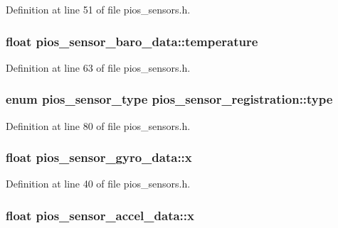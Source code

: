 Definition at line 51 of file pios\-\_\-sensors.\-h.

\hypertarget{group___p_i_o_s___s_e_n_s_o_r_s_ga9cb0c320301d3a8028859d3bf920669f}{
\subsubsection[{temperature}]{\setlength{\rightskip}{0pt plus 5cm}float pios\-\_\-sensor\-\_\-baro\-\_\-data\-::temperature}}\label{group___p_i_o_s___s_e_n_s_o_r_s_ga9cb0c320301d3a8028859d3bf920669f}


Definition at line 63 of file pios\-\_\-sensors.\-h.

\hypertarget{group___p_i_o_s___s_e_n_s_o_r_s_gaf66f51be389998d910c8e9d3fc826a75}{
\subsubsection[{type}]{\setlength{\rightskip}{0pt plus 5cm}enum {\bf pios\-\_\-sensor\-\_\-type} pios\-\_\-sensor\-\_\-registration\-::type}}\label{group___p_i_o_s___s_e_n_s_o_r_s_gaf66f51be389998d910c8e9d3fc826a75}


Definition at line 80 of file pios\-\_\-sensors.\-h.

\hypertarget{group___p_i_o_s___s_e_n_s_o_r_s_gaa3675ec6a2d0ed4f805311fef19c0c8b}{
\subsubsection[{x}]{\setlength{\rightskip}{0pt plus 5cm}float pios\-\_\-sensor\-\_\-gyro\-\_\-data\-::x}}\label{group___p_i_o_s___s_e_n_s_o_r_s_gaa3675ec6a2d0ed4f805311fef19c0c8b}


Definition at line 40 of file pios\-\_\-sensors.\-h.

\hypertarget{group___p_i_o_s___s_e_n_s_o_r_s_gae32485cbb3023e21caf5ac1fd8378fb3}{
\subsubsection[{x}]{\setlength{\rightskip}{0pt plus 5cm}float pios\-\_\-sensor\-\_\-accel\-\_\-data\-::x}}\label{group___p_i_o_s___s_e_n_s_o_r_s_gae32485cbb3023e21caf5ac1fd8378fb3}


